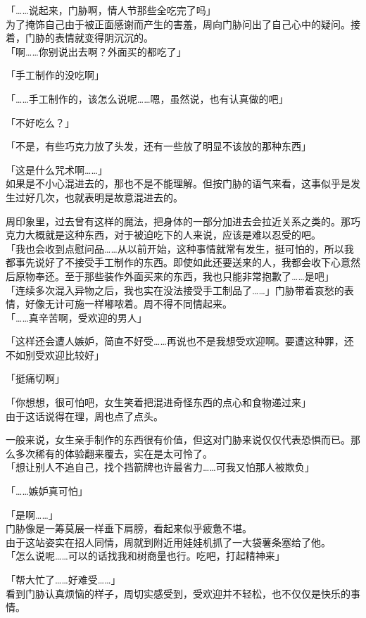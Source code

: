 「……说起来，门胁啊，情人节那些全吃完了吗」\\

为了掩饰自己由于被正面感谢而产生的害羞，周向门胁问出了自己心中的疑问。接着，门胁的表情就变得阴沉沉的。\\

「啊……你别说出去啊？外面买的都吃了」

「手工制作的没吃啊」

「……手工制作的，该怎么说呢……嗯，虽然说，也有认真做的吧」

「不好吃么？」

「不是，有些巧克力放了头发，还有一些放了明显不该放的那种东西」

「这是什么咒术啊……」\\

如果是不小心混进去的，那也不是不能理解。但按门胁的语气来看，这事似乎是发生过好几次，也就表明是故意混进去的。

周印象里，过去曾有这样的魔法，把身体的一部分加进去会拉近关系之类的。那巧克力大概就是这种东西，对于被迫吃下的人来说，应该是难以忍受的吧。\\

「我也会收到点慰问品……从以前开始，这种事情就常有发生，挺可怕的，所以我都事先说好了不接受手工制作的东西。即使如此还要送来的人，我都会收下心意然后原物奉还。至于那些装作外面买来的东西，我也只能非常抱歉了……是吧」\\

「连续多次混入异物之后，我也实在没法接受手工制品了……」门胁带着哀愁的表情，好像无计可施一样嘟哝着。周不得不同情起来。\\

「……真辛苦啊，受欢迎的男人」

「这样还会遭人嫉妒，简直不好受……再说也不是我想受欢迎啊。要遭这种罪，还不如别受欢迎比较好」

「挺痛切啊」

「你想想，很可怕吧，女生笑着把混进奇怪东西的点心和食物递过来」\\

由于这话说得在理，周也点了点头。

一般来说，女生亲手制作的东西很有价值，但这对门胁来说仅仅代表恐惧而已。那么多次稀有的体验翻来覆去，实在是太可怜了。\\

「想让别人不追自己，找个挡箭牌也许最省力……可我又怕那人被欺负」

「……嫉妒真可怕」

「是啊……」\\

门胁像是一筹莫展一样垂下肩膀，看起来似乎疲惫不堪。\\

由于这站姿实在招人同情，周就到附近用娃娃机抓了一大袋薯条塞给了他。\\

「怎么说呢……可以的话找我和树商量也行。吃吧，打起精神来」

「帮大忙了……好难受……」\\

看到门胁认真烦恼的样子，周切实感受到，受欢迎并不轻松，也不仅仅是快乐的事情。
